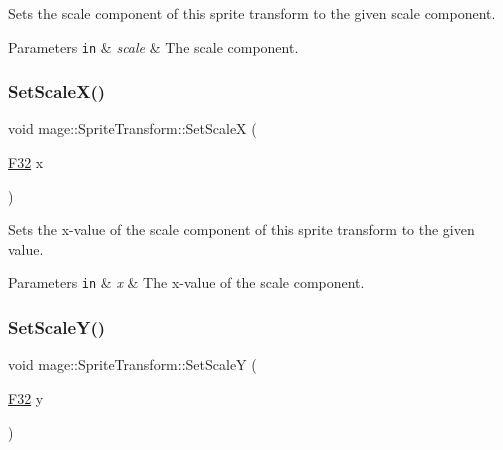 Sets the scale component of this sprite transform to the given scale component.


\begin{DoxyParams}[1]{Parameters}
\mbox{\tt in}  & {\em scale} & The scale component. \\
\hline
\end{DoxyParams}
\hypertarget{structmage_1_1_sprite_transform_a2e19b9bffce49955e57094b1eda6af52}{}\label{structmage_1_1_sprite_transform_a2e19b9bffce49955e57094b1eda6af52} 
\subsubsection{\texorpdfstring{Set\+Scale\+X()}{SetScaleX()}}
{\footnotesize\ttfamily void mage\+::\+Sprite\+Transform\+::\+Set\+ScaleX (\begin{DoxyParamCaption}\item[{\hyperlink{namespacemage_aa97e833b45f06d60a0a9c4fc22ae02c0}{F32}}]{x }\end{DoxyParamCaption})\hspace{0.3cm}{\ttfamily [noexcept]}}

Sets the x-\/value of the scale component of this sprite transform to the given value.


\begin{DoxyParams}[1]{Parameters}
\mbox{\tt in}  & {\em x} & The x-\/value of the scale component. \\
\hline
\end{DoxyParams}
\hypertarget{structmage_1_1_sprite_transform_a98304f37ff1aa359122e9ea08b060415}{}\label{structmage_1_1_sprite_transform_a98304f37ff1aa359122e9ea08b060415} 
\subsubsection{\texorpdfstring{Set\+Scale\+Y()}{SetScaleY()}}
{\footnotesize\ttfamily void mage\+::\+Sprite\+Transform\+::\+Set\+ScaleY (\begin{DoxyParamCaption}\item[{\hyperlink{namespacemage_aa97e833b45f06d60a0a9c4fc22ae02c0}{F32}}]{y }\end{DoxyParamCaption})\hspace{0.3cm}{\ttfamily [noexcept]}}

